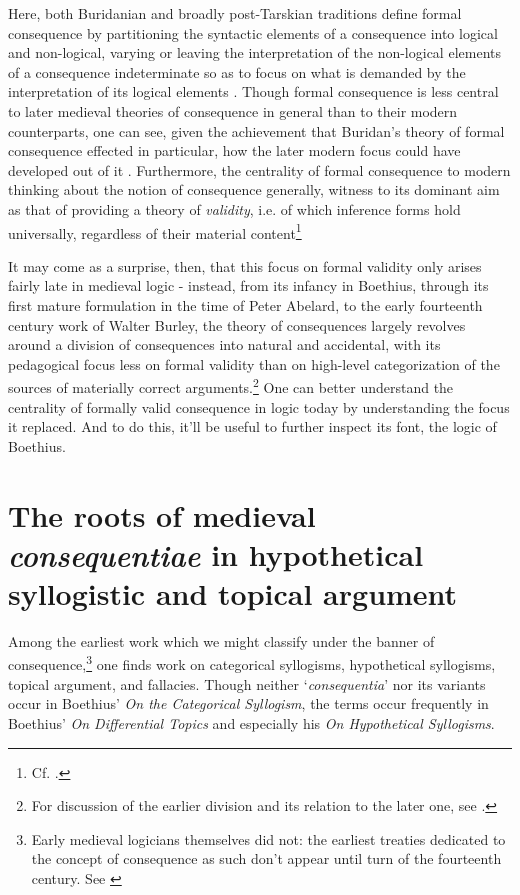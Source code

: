 \documentclass[a4paper, 11pt]{article}
\begin{document}
Here, both Buridanian and broadly post-Tarskian traditions define formal consequence by partitioning the syntactic elements of a consequence into logical and non-logical, varying or leaving the interpretation of the non-logical elements of a consequence indeterminate so as to focus on what is demanded by the interpretation of its logical elements \autocite[314-321]{DutilhNovaes2011}. Though formal consequence is less central to later medieval theories of consequence in general than to their modern counterparts, one can see, given the achievement that Buridan's theory of formal consequence effected in particular, how the later modern focus could have developed out of it \autocite{Archambault2018a}. Furthermore, the centrality of formal consequence to modern thinking about the notion of consequence generally, witness to its dominant aim as that of providing a theory of \emph{validity}, i.e. of which inference forms hold universally, regardless of their material content\footnote{Cf. \autocite{Etchemendy2008,MacFarlane2000}.} 

It may come as a surprise, then, that this focus on formal validity only arises fairly late in medieval logic - instead, from its infancy in Boethius, through its first mature formulation in the time of Peter Abelard, to the early fourteenth century work of Walter Burley, the theory of consequences largely revolves around a division of consequences into natural and accidental, with its pedagogical focus less on formal validity than on high-level categorization of the sources of materially correct arguments.\footnote{For discussion of the earlier division and its relation to the later one, see \autocite{Martin2018,Martin2004,Archambault2018a}.} One can better understand the centrality of formally valid consequence in logic today by understanding the focus it replaced. And to do this, it'll be useful to further inspect its font, the logic of Boethius.

\section{The roots of medieval \emph{consequentiae} in hypothetical syllogistic and topical argument}
Among the earliest work which we might classify under the banner of consequence,\footnote{Early medieval logicians themselves did not: the earliest treaties dedicated to the concept of consequence as such don't appear until turn of the fourteenth century. See \autocite{Archambault2017d}} one finds work on categorical syllogisms, hypothetical syllogisms, topical argument, and fallacies. Though neither `\emph{consequentia}' nor its variants occur in Boethius' \textit{On the Categorical Syllogism}, the terms occur frequently in Boethius' \emph{On Differential Topics} and especially his \emph{On Hypothetical Syllogisms}.
\end{document}
